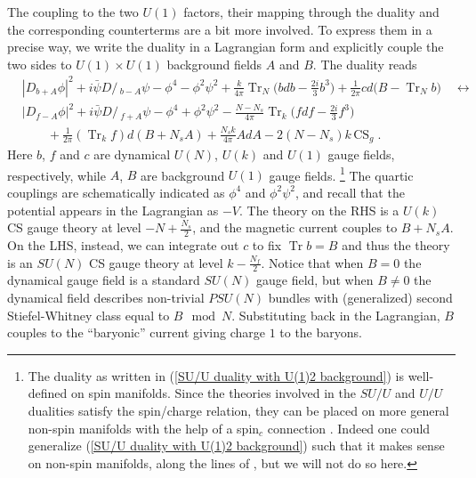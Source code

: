 \documentclass[a4paper, 12pt]{article}
\numberwithin{equation}{section}
\newcommand{\Dslash}{D\!\!\!\!\slash\,}
\newcommand{\nn}{\nonumber}
\DeclareMathOperator{\Tr}{Tr}
\begin{document}
The coupling to the two $U(1)$ factors, their mapping through the duality and the corresponding counterterms are a bit more involved. To express them in a precise way, we write the duality in a Lagrangian form and explicitly couple the two sides to $U(1) \times U(1)$ background fields $A$ and $B$. The duality reads
\begin{align}
& |D_{b+A}\phi|^2 + i \bar\psi \Dslash_{b-A} \psi - \phi^4 - \phi^2\psi^2 + \frac{k}{4\pi} \Tr_N \Big( bdb- \frac{2i}3 b^3 \Big) + \frac1{2\pi} cd\big( B -  \Tr_N b \big) \quad\longleftrightarrow \nn\\
& |D_{f-A}\phi|^2  + i \bar\psi \Dslash_{f+A} \psi - \phi^4 + \phi^2\psi^2 - \frac{N-N_s}{4\pi} \Tr_k \Big( fdf - \frac{2i}3 f^3 \Big) \nn\\
&\qquad + \frac1{2\pi} (\Tr_k f) d(B + N_s A) + \frac{N_s k}{4\pi} AdA -2 (N- N_s)k \, \text{CS}_g \;.
\label{SU/U duality with U(1)2 background}
\end{align}
Here $b$, $f$ and $c$ are dynamical $U(N)$, $U(k)$ and $U(1)$ gauge fields, respectively, while $A$, $B$ are background $U(1)$ gauge fields.%
\footnote{The duality as written in (\ref{SU/U duality with U(1)2 background}) is well-defined on spin manifolds. Since the theories involved in the $SU/U$ and $U/U$ dualities satisfy the spin/charge relation, they can be placed on more general non-spin manifolds with the help of a spin$_c$ connection \cite{Seiberg:2016gmd}. Indeed one could generalize (\ref{SU/U duality with U(1)2 background}) such that it makes sense on non-spin manifolds, along the lines of \cite{Hsin:2016blu}, but we will not do so here.}
The quartic couplings are schematically indicated as $\phi^4$ and $\phi^2\psi^2$, and recall that the potential appears in the Lagrangian as $-V$. The theory on the RHS is a $U(k)$ CS gauge theory at level $-N + \frac{N_s}2$, and the magnetic current couples to $B + N_sA$. On the LHS, instead, we can integrate out $c$ to fix $\Tr b = B$ and thus the theory is an $SU(N)$ CS gauge theory at level $k-\frac{N_f}2$. Notice that when $B=0$ the dynamical gauge field is a standard $SU(N)$ gauge field, but when $B\neq 0$ the dynamical field describes non-trivial $PSU(N)$ bundles with (generalized) second Stiefel-Whitney class equal to $B \mod N$. Substituting back in the Lagrangian, $B$ couples to the ``baryonic'' current giving charge $1$ to the baryons.
\end{document}
